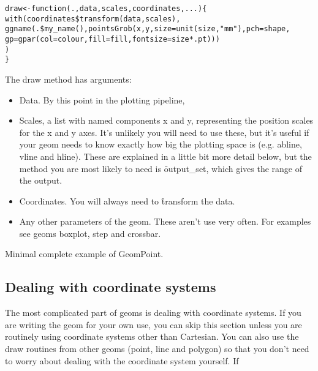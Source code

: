 % 
\begin{alltt}
draw <- function(., data, scales, coordinates, ...) \{    
  with(coordinates\$transform(data, scales), 
    ggname(.\$my\_name(), pointsGrob(x, y, size=unit(size, "mm"), pch=shape, 
    gp=gpar(col=colour, fill = fill, fontsize = size * .pt)))
  )
\}\end{alltt}


The draw method has arguments:

\begin{itemize}
  \item Data.  By this point in the plotting pipeline, 

  \item Scales, a list with named components x and y, representing the position scales for the x and y axes.  It's unlikely you will need to use these, but it's useful if your geom needs to know exactly how big the plotting space is (e.g. abline, vline and hline).  These are explained in a little bit more detail below, but the method you are most likely to need is \f{output_set}, which gives the range of the output.

  \item Coordinates.  You will always need to \f{transform} the data.

  \item Any other parameters of the geom.  These aren't use very often.  For examples see geoms boxplot, step and crossbar.
\end{itemize}

Minimal complete example of GeomPoint.


\subsection{Dealing with coordinate systems}

The most complicated part of geoms is dealing with coordinate systems. If you are writing the geom for your own use, you can skip this section unless you are routinely using coordinate systems other than Cartesian.  You can also use the draw routines from other geoms (point, line and polygon) so that you don't need to worry about dealing with the coordinate system yourself.  If 

